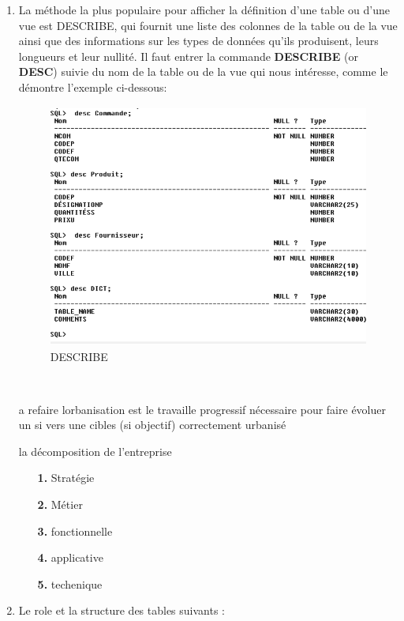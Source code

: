 \begin{enumerate}

    \item La méthode la plus populaire pour afficher la définition d’une table ou d’une vue est DESCRIBE, qui fournit une liste des colonnes de la table ou de la vue ainsi que des informations sur les types de données qu’ils produisent, leurs longueurs et leur nullité. Il faut entrer la commande \textbf{DESCRIBE} (or \textbf{DESC}) suivie du nom de la table ou de la vue qui nous intéresse, comme le démontre l’exemple ci-dessous:
        \begin{figure}[h]
            \centering
            \includegraphics[width=14cm, height=8cm]{DESC.png}
            \caption{DESCRIBE }
            \end{figure}
            \\
     \par a refaire lorbanisation est le travaille progressif nécessaire pour faire évoluer un si vers une cibles (si objectif) correctement urbanisé
     \par la décomposition de l'entreprise 
     {\begin{itemize}
         \item [\textbf{1.}] Stratégie
         \item [\textbf{2.}] Métier
         \item [\textbf{3.}] fonctionnelle
         \item [\textbf{4.}] applicative
         \item [\textbf{5.}] techenique
     \end{itemize}}
     
     
    \item Le role et la structure des tables suivants :
    

\end{enumerate}
